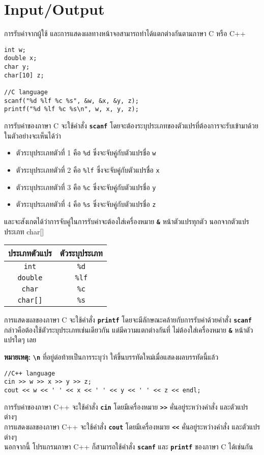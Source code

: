 \section{Input/Output}

การรับค่าจากผู้ใช้ และการแสดงผลทางหน้าจอสามารถทำได้แตกต่างกันตามภาษา C หรือ C++
\begin{lstlisting}
int w;
double x;
char y;
char[10] z;

//C language
scanf("%d %lf %c %s", &w, &x, &y, z);
printf("%d %lf %c %s\n", w, x, y, z);
\end{lstlisting}
การรับค่าของภาษา C จะใช้คำสั่ง \textbf{\texttt{scanf}} โดยจะต้องระบุประเภทของตัวแปรที่ต้องการจะรับเข้ามาด้วย ในตัวอย่างจะเห็นได้ว่า
\begin{itemize}
\item ตัวระบุประเภทตัวที่ 1 คือ \texttt{\%d} ซึ่งจะจับคู่กับตัวแปรชื่อ \texttt{w}
\item ตัวระบุประเภทตัวที่ 2 คือ \texttt{\%lf} ซึ่งจะจับคู่กับตัวแปรชื่อ \texttt{x}
\item ตัวระบุประเภทตัวที่ 3 คือ \texttt{\%c} ซึ่งจะจับคู่กับตัวแปรชื่อ \texttt{y}
\item ตัวระบุประเภทตัวที่ 4 คือ \texttt{\%s} ซึ่งจะจับคู่กับตัวแปรชื่อ \texttt{z}
\end{itemize}
และจะสังเกตได้ว่าการจับคู่ในการรับค่าจะต้องใส่เครื่องหมาย \textbf{\texttt{\&}} หน้าตัวแปรทุกตัว นอกจากตัวแปรประเภท char[]
\begin{center}
\begin{tabular}{||c|c||}
\hline
ประเภทตัวแปร & ตัวระบุประเภท \\
\hline
\texttt{int} & \texttt{\%d} \\
\texttt{double} & \texttt{\%lf} \\
\texttt{char} & \texttt{\%c} \\
\texttt{char[]} & \texttt{\%s} \\
\hline
\end{tabular}
\end{center}
การแสดงผลของภาษา C จะใช้คำสั่ง \textbf{\texttt{printf}} โดยจะมีลักษณะคล้ายกับการรับค่าด้วยคำสั่ง \textbf{\texttt{scanf}} กล่าวคือต้องใช้ตัวระบุประเภทเช่นเดียวกัน แต่มีความแตกต่างกันที่ ไม่ต้องใส่เครื่องหมาย \textbf{\texttt{\&}} หน้าตัวแปรใดๆ เลย

\noindent\textbf{หมายเหตุ:} \textbf{\texttt{\textbackslash n}} ที่อยู่ต่อท้ายเป็นการระบุว่า ให้ขึ้นบรรทัดใหม่เมื่อแสดงผลบรรทัดนี้แล้ว

\begin{lstlisting}
//C++ language
cin >> w >> x >> y >> z;
cout << w << ' ' << x << ' ' << y << ' ' << z << endl;
\end{lstlisting}
การรับค่าของภาษา C++ จะใช้คำสั่ง \textbf{\texttt{cin}} โดยมีเครื่องหมาย \textbf{\texttt{>>}} คั่นอยู่ระหว่างคำสั่ง และตัวแปรต่างๆ \\
การแสดงผลของภาษา C++ จะใช้คำสั่ง \textbf{\texttt{cout}} โดยมีเครื่องหมาย \textbf{\texttt{<<}} คั่นอยู่ระหว่างคำสั่ง และตัวแปรต่างๆ \\
นอกจากนี้ โปรแกรมภาษา C++ ก็สามารถใช้คำสั่ง \textbf{\texttt{scanf}} และ \textbf{\texttt{printf}} ของภาษา C ได้เช่นกัน

